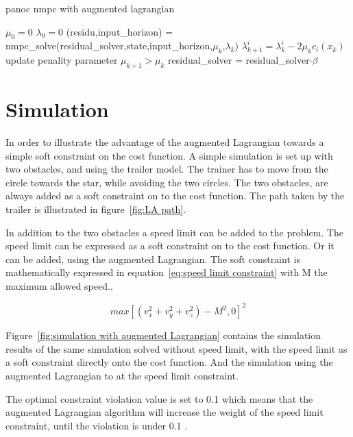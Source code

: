 	\begin{algorithm}
		\caption{panoc nmpc with augmented lagrangian}
		\label{alg:panoc with augmented lagrangian}
		\begin{algorithmic}[1]
			\State $\mu_0=0$
			\State $\lambda_0=0$
			\State (residu,input\_horizon) = nmpc\_solve(residual\_solver,state,input\_horizon,$\mu_k$,$\lambda_k$)
			\State $\lambda_{k+1}^{i} = \lambda_{k}^{i} - 2\mu_k c_i(x_k)$
			\State update penality parameter $\mu_{k+1}>\mu_k$
			\State residual\_solver =  residual\_solver$\cdot \beta$
			\EndWhile
			\EndProcedure
		\end{algorithmic}
	\end{algorithm}

\section{Simulation}
In order to illustrate the advantage of the augmented Lagrangian towards a simple soft constraint on the cost function. A simple simulation is set up with two obstacles, and using the trailer model. The trainer has to move from the circle towards the star, while avoiding the two circles. The two obstacles, are always added as a soft constraint on to the cost function. The path taken by the trailer is illustrated in figure~\ref{fig:LA path}.

In addition to the two obstacles a speed limit can be added to the problem. The speed limit can be expressed as a soft constraint on to the cost function. Or it can be added, using the augmented Lagrangian. The soft constraint is mathematically expressed in equation~\ref{eq:speed limit constraint} with M the maximum allowed speed..

\begin{equation}
max[(v_x^2+v_y^2+v_z^2)-M^2,0]^2
\label{eq:speed limit constraint}
\end{equation}

Figure~\ref{fig:simulation with augmented Lagrangian} contains the simulation results of the same simulation solved without speed limit, with the speed limit as a soft constraint directly onto the cost function. And the simulation using the augmented Lagrangian to at the speed limit constraint.

The optimal constraint violation value is set to 0.1 which means that the augmented Lagrangian algorithm will increase the weight of the speed limit constraint, until the violation is under 0.1 . 

